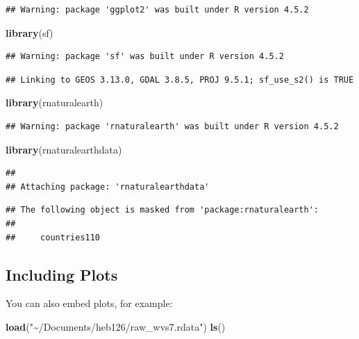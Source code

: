 \documentclass[
]{article}
\newenvironment{Shaded}{\begin{snugshade}}{\end{snugshade}}
\newcommand{\FunctionTok}[1]{\textcolor[rgb]{0.13,0.29,0.53}{\textbf{#1}}}
\newcommand{\NormalTok}[1]{#1}
\newcommand{\StringTok}[1]{\textcolor[rgb]{0.31,0.60,0.02}{#1}}
\begin{document}
\begin{verbatim}
## Warning: package 'ggplot2' was built under R version 4.5.2
\end{verbatim}

\begin{Shaded}
\begin{Highlighting}[]
\FunctionTok{library}\NormalTok{(sf)}
\end{Highlighting}
\end{Shaded}

\begin{verbatim}
## Warning: package 'sf' was built under R version 4.5.2
\end{verbatim}

\begin{verbatim}
## Linking to GEOS 3.13.0, GDAL 3.8.5, PROJ 9.5.1; sf_use_s2() is TRUE
\end{verbatim}

\begin{Shaded}
\begin{Highlighting}[]
\FunctionTok{library}\NormalTok{(rnaturalearth)}
\end{Highlighting}
\end{Shaded}

\begin{verbatim}
## Warning: package 'rnaturalearth' was built under R version 4.5.2
\end{verbatim}

\begin{Shaded}
\begin{Highlighting}[]
\FunctionTok{library}\NormalTok{(rnaturalearthdata)}
\end{Highlighting}
\end{Shaded}

\begin{verbatim}
## 
## Attaching package: 'rnaturalearthdata'
\end{verbatim}

\begin{verbatim}
## The following object is masked from 'package:rnaturalearth':
## 
##     countries110
\end{verbatim}

\subsection{Including Plots}\label{including-plots}

You can also embed plots, for example:

\begin{Shaded}
\begin{Highlighting}[]
\FunctionTok{load}\NormalTok{(}\StringTok{"\textasciitilde{}/Documents/heb126/raw\_wvs7.rdata"}\NormalTok{)}
\FunctionTok{ls}\NormalTok{()}
\end{Highlighting}
\end{Shaded}
\end{document}
